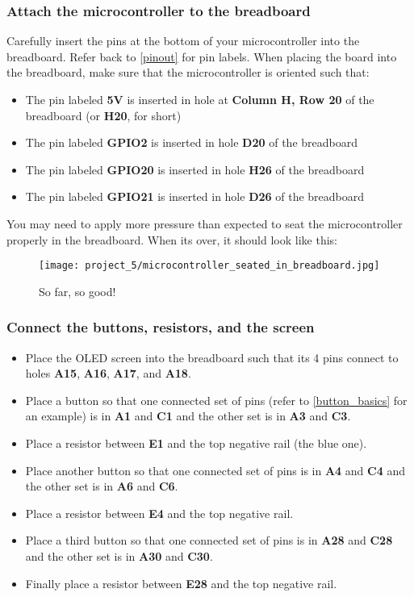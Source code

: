 \subsubsection{Attach the microcontroller to the breadboard}
Carefully insert the pins at the bottom of your microcontroller into the breadboard. Refer back to \ref{pinout} for pin labels.
When placing the board into the breadboard, make sure that the microcontroller is oriented such that:
\begin{itemize}
    \item The pin labeled \textbf{5V} is inserted in hole at \textbf{Column H, Row 20} of the breadboard (or \textbf{H20}, for short)
    \item The pin labeled \textbf{GPIO2} is inserted in hole \textbf{D20} of the breadboard
    \item The pin labeled \textbf{GPIO20} is inserted in hole \textbf{H26} of the breadboard
    \item The pin labeled \textbf{GPIO21} is inserted in hole \textbf{D26} of the breadboard
\end{itemize}
You may need to apply more pressure than expected to seat the microcontroller properly in the breadboard. When its over, it should look like this:
\begin{figure}[H]
    \centering
    \texttt{[image: project\_5/microcontroller\_seated\_in\_breadboard.jpg]}
    \caption{So far, so good!}
\end{figure}

\subsubsection{Connect the buttons, resistors, and the screen}
\begin{itemize}
    \item Place the OLED screen into the breadboard such that its 4 pins connect to holes \textbf{A15}, \textbf{A16}, \textbf{A17}, and \textbf{A18}.
    \item Place a button so that one connected set of pins (refer to \ref{button_basics} for an example) is in \textbf{A1}
    and \textbf{C1} and the other set is in \textbf{A3} and \textbf{C3}.
    \item Place a resistor between \textbf{E1} and the top negative rail (the blue one).
    \item Place another button so that one connected set of pins is in \textbf{A4} and \textbf{C4}
    and the other set is in \textbf{A6} and \textbf{C6}.
    \item Place a resistor between \textbf{E4} and the top negative rail.
    \item Place a third button so that one connected set of pins is in \textbf{A28} and \textbf{C28}
    and the other set is in \textbf{A30} and \textbf{C30}.
    \item Finally place a resistor between \textbf{E28} and the top negative rail.
\end{itemize}

